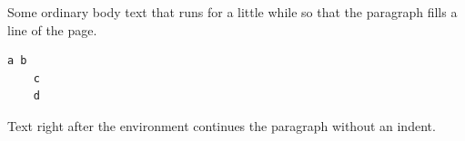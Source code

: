 \documentclass{article}
\begin{document}
Some ordinary body text that runs for a little while so that the paragraph fills a line of the page.
\begin{lstlisting}[basicstyle=\ttfamily,tabsize=4,gobble=2]
  a	b
  	c
    d
\end{lstlisting}
Text right after the environment continues the paragraph without an indent.
\end{document}
